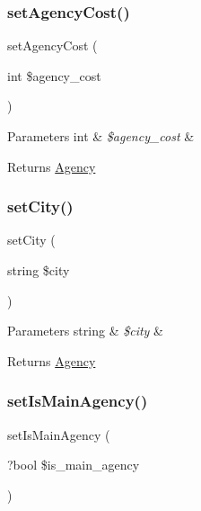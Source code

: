 \subsubsection{\texorpdfstring{setAgencyCost()}{setAgencyCost()}}
{\footnotesize\ttfamily set\+Agency\+Cost (\begin{DoxyParamCaption}\item[{int}]{\$agency\+\_\+cost }\end{DoxyParamCaption})}


\begin{DoxyParams}[1]{Parameters}
int & {\em \$agency\+\_\+cost} & \\
\hline
\end{DoxyParams}
\begin{DoxyReturn}{Returns}
\mbox{\hyperlink{class_app_1_1_entity_1_1_agency}{Agency}} 
\end{DoxyReturn}
\mbox{\label{class_app_1_1_entity_1_1_agency_af5d7dc38965353521a771e7ea053d2ef}} 
\subsubsection{\texorpdfstring{setCity()}{setCity()}}
{\footnotesize\ttfamily set\+City (\begin{DoxyParamCaption}\item[{string}]{\$city }\end{DoxyParamCaption})}


\begin{DoxyParams}[1]{Parameters}
string & {\em \$city} & \\
\hline
\end{DoxyParams}
\begin{DoxyReturn}{Returns}
\mbox{\hyperlink{class_app_1_1_entity_1_1_agency}{Agency}} 
\end{DoxyReturn}
\mbox{\label{class_app_1_1_entity_1_1_agency_a42f4c1e41051c02c6f3b3b56eebef37c}} 
\subsubsection{\texorpdfstring{setIsMainAgency()}{setIsMainAgency()}}
{\footnotesize\ttfamily set\+Is\+Main\+Agency (\begin{DoxyParamCaption}\item[{?bool}]{\$is\+\_\+main\+\_\+agency }\end{DoxyParamCaption})}


